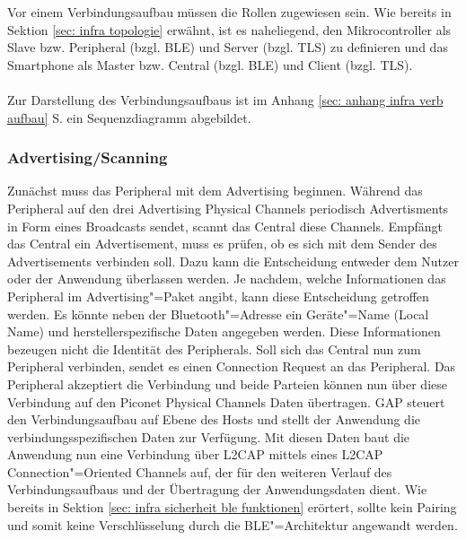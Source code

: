 Vor einem Verbindungsaufbau müssen die Rollen zugewiesen sein. Wie bereits in Sektion \ref{sec: infra topologie} erwähnt, ist es naheliegend, den Mikrocontroller als Slave bzw. Peripheral (bzgl. BLE) und Server (bzgl. TLS) zu definieren und das Smartphone als Master bzw. Central (bzgl. BLE) und Client (bzgl. TLS).
\\\\
Zur Darstellung des Verbindungsaufbaus ist im Anhang \ref{sec: anhang infra verb aufbau} S. \pageref{sec: anhang infra verb aufbau} ein Sequenzdiagramm abgebildet.

\subsubsection{Advertising/Scanning}
Zunächst muss das Peripheral mit dem Advertising beginnen. Während das Peripheral auf den drei Advertising Physical Channels periodisch Advertisments in Form eines Broadcasts sendet, scannt das Central diese Channels. Empfängt das Central ein Advertisement, muss es prüfen, ob es sich mit dem Sender des Advertisements verbinden soll. Dazu kann die Entscheidung entweder dem Nutzer oder der Anwendung überlassen werden. Je nachdem, welche Informationen das Peripheral im Advertising"=Paket angibt, kann diese Entscheidung getroffen werden. Es könnte neben der Bluetooth"=Adresse ein Geräte"=Name (Local Name) und herstellerspezifische Daten angegeben werden. Diese Informationen bezeugen nicht die Identität des Peripherals. Soll sich das Central nun zum Peripheral verbinden, sendet es einen Connection Request an das Peripheral. Das Peripheral akzeptiert die Verbindung und beide Parteien können nun über diese Verbindung auf den Piconet Physical Channels Daten übertragen. GAP steuert den Verbindungsaufbau auf Ebene des Hosts und stellt der Anwendung die verbindungsspezifischen Daten zur Verfügung. Mit diesen Daten baut die Anwendung nun eine Verbindung über L2CAP mittels eines L2CAP Connection"=Oriented Channels auf, der für den weiteren Verlauf des Verbindungsaufbaus und der Übertragung der Anwendungsdaten dient. Wie bereits in Sektion \ref{sec: infra sicherheit ble funktionen} erörtert, sollte kein Pairing und somit keine Verschlüsselung durch die BLE"=Architektur angewandt werden.

